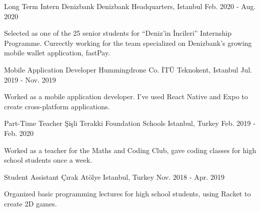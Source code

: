 

\begin{cventries}
\cventry
{Long Term Intern} %
{Denizbank} %
{Denizbank Headquarters, Istanbul} %
{Feb. 2020 - Aug. 2020} %
{ %
\begin{cvitems}
\item {Selected as one of the 25 senior students for ``Deniz'in İncileri'' Internship Programme. Currectly working for the team specialized on Denizbank's growing mobile wallet application, fastPay.}
\end{cvitems}
}


\cventry
{Mobile Application Developer} %
{Hummingdrone Co.} %
{İTÜ Teknokent, Istanbul} %
{Jul. 2019 - Nov. 2019} %
{ %
\begin{cvitems}
\item {Worked as a mobile application developer. I've used React Native and Expo to create cross-platform applications.}
\end{cvitems}
}


\cventry
{Part-Time Teacher} %
{Şişli Terakki Foundation Schools} %
{Istanbul, Turkey} %
{Feb. 2019 - Feb. 2020} %
{ %
\begin{cvitems}
\item {Worked as a teacher for the Maths and Coding Club, gave coding classes for high school students once a week.}
\end{cvitems}
}


\cventry
{Student Assistant} %
{Çırak Atölye} %
{Istanbul, Turkey} %
{Nov. 2018 - Apr. 2019} %
{ %
\begin{cvitems}
\item {Organized basic programming lectures for high school students, using Racket to create 2D games.}
\end{cvitems}
}


\end{cventries}
